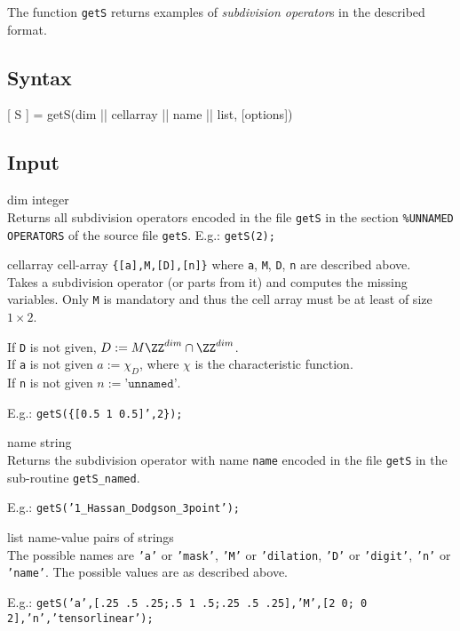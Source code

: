 The function \texttt{getS} returns examples of \emph{subdivision operator}s in the described format.

\subsection*{Syntax}
\begin{param}
\item[{[ S ] = getS(dim || cellarray || name || list, [options])}]
\end{param}

\subsection*{Input}
\begin{param}
    \item[dim] integer\\
    Returns all subdivision operators encoded in the file \texttt{getS} in the section \texttt{\%UNNAMED OPERATORS} of the source file \texttt{getS}.
    E.g.: \texttt{getS(2);}
    
    \item[cellarray] cell-array \texttt{\{[a],M,[D],[n]\}} where \texttt{a}, \texttt{M}, \texttt{D}, \texttt{n} are described above.\\
    Takes a subdivision operator (or parts from it) and computes the missing variables. Only \texttt{M} is mandatory and thus the cell array must be at least of size $1\times2$.
    
    If \texttt{D} is not given, $D:=M\ZZ^{dim}\cap\ZZ^{dim}$.\\
    If \texttt{a} is not given $a:=\chi_D$, where $\chi$ is the characteristic function.\\
    If \texttt{n} is not given $n:=\texttt{'unnamed'}$.
    
    E.g.: \texttt{getS(\{[0.5 1 0.5]',2\});}
    
    
    \item[name] string\\
    Returns the subdivision operator with name \texttt{name} encoded in the file \texttt{getS} in the sub-routine \texttt{getS\_named}.
    
    E.g.: \texttt{getS('1\_Hassan\_Dodgson\_3point');}
    
    \item[list] name-value pairs of strings\\
    The possible names are 
    \texttt{'a'} or \texttt{'mask'}, 
    \texttt{'M'} or \texttt{'dilation}, 
    \texttt{'D'} or \texttt{'digit'}, 
    \texttt{'n'} or \texttt{'name'}.
    The possible values are as described above.
    
    E.g.: \texttt{getS('a',[.25 .5 .25;.5 1 .5;.25 .5 .25],'M',[2 0; 0 2],'n','tensorlinear');}    
\end{param}

